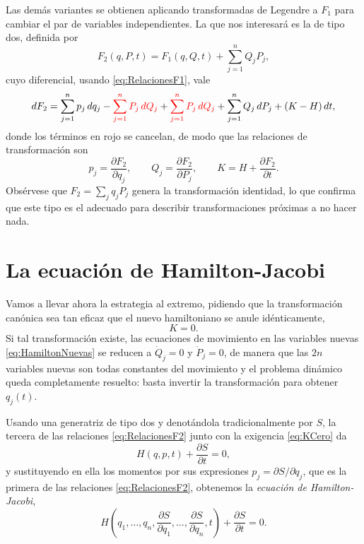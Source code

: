     Las demás variantes se obtienen aplicando transformadas de Legendre a $F_{1}$ para cambiar el par de variables independientes. La que nos interesará es la de tipo dos, definida por
    \begin{equation}\label{eq:F2}
        F_{2}(q,P,t) = F_{1}(q,Q,t) + \sum_{j=1}^{n}Q_{j}P_{j},
    \end{equation}
    cuyo diferencial, usando \eqref{eq:RelacionesF1}, vale
    \begin{equation}\label{eq:DiferencialF2}
        dF_{2} = \sum_{j=1}^{n}p_{j}\,dq_{j} - \textcolor{red}{\sum_{j=1}^{n}P_{j}\,dQ_{j}} + \textcolor{red}{\sum_{j=1}^{n}P_{j}\,dQ_{j}} + \sum_{j=1}^{n}Q_{j}\,dP_{j} + \left(K-H\right)dt,
    \end{equation}
    donde los términos en rojo se cancelan, de modo que las relaciones de transformación son
    \begin{equation}\label{eq:RelacionesF2}
        p_{j} = \frac{\partial F_{2}}{\partial q_{j}},
        \qquad
        Q_{j} = \frac{\partial F_{2}}{\partial P_{j}},
        \qquad
        K = H + \frac{\partial F_{2}}{\partial t} .
    \end{equation}
    Obsérvese que $F_{2} = \sum_{j}q_{j}P_{j}$ genera la transformación identidad, lo que confirma que este tipo es el adecuado para describir transformaciones próximas a no hacer nada.

\section{La ecuación de Hamilton-Jacobi}

        Vamos a llevar ahora la estrategia al extremo, pidiendo que la transformación canónica sea tan eficaz que el nuevo hamiltoniano se anule idénticamente,
        \begin{equation}\label{eq:KCero}
            K = 0 .
        \end{equation}
        Si tal transformación existe, las ecuaciones de movimiento en las variables nuevas \eqref{eq:HamiltonNuevas} se reducen a $\dot{Q}_{j} = 0$ y $\dot{P}_{j} = 0$, de manera que las $2n$ variables nuevas son todas constantes del movimiento y el problema dinámico queda completamente resuelto: basta invertir la transformación para obtener $q_{j}(t)$.

        Usando una generatriz de tipo dos y denotándola tradicionalmente por $S$, la tercera de las relaciones \eqref{eq:RelacionesF2} junto con la exigencia \eqref{eq:KCero} da
        \begin{equation}\label{eq:HJPrevia}
            H\left(q,p,t\right) + \frac{\partial S}{\partial t} = 0,
        \end{equation}
        y sustituyendo en ella los momentos por sus expresiones $p_{j} = \partial S/\partial q_{j}$, que es la primera de las relaciones \eqref{eq:RelacionesF2}, obtenemos la \textit{ecuación de Hamilton-Jacobi},
        \begin{equation}\label{eq:HamiltonJacobi}
            \boxed{\;H\left(q_{1},\ldots,q_{n},\frac{\partial S}{\partial q_{1}},\ldots,\frac{\partial S}{\partial q_{n}},t\right) + \frac{\partial S}{\partial t} = 0 .\;}
        \end{equation}

